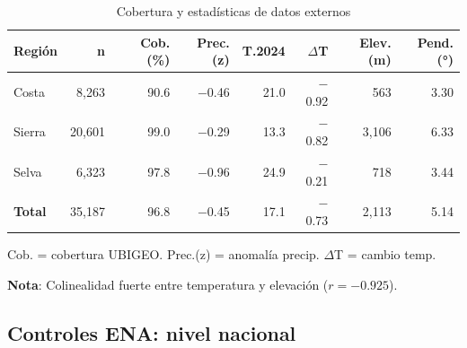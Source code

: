 \documentclass[11pt,a4paper]{article}
\begin{document}
\begin{table}[H]
\centering
\caption{Cobertura y estadísticas de datos externos}
\label{tab:geo_coverage}
\begin{threeparttable}
\small
\begin{tabular}{lrrrrrrr}
\toprule
\textbf{Región} & \textbf{n} & \textbf{Cob. (\%)} & \textbf{Prec.(z)} & \textbf{T.2024} & \textbf{$\Delta$T} & \textbf{Elev.(m)} & \textbf{Pend.(°)} \\
\midrule
Costa & 8,263 & 90.6 & $-$0.46 & 21.0 & $-$0.92 & 563 & 3.30 \\
Sierra & 20,601 & 99.0 & $-$0.29 & 13.3 & $-$0.82 & 3,106 & 6.33 \\
Selva & 6,323 & 97.8 & $-$0.96 & 24.9 & $-$0.21 & 718 & 3.44 \\
\midrule
\textbf{Total} & 35,187 & 96.8 & $-$0.45 & 17.1 & $-$0.73 & 2,113 & 5.14 \\
\bottomrule
\end{tabular}
\begin{tablenotes}
\footnotesize
\item Cob. = cobertura UBIGEO. Prec.(z) = anomalía precip. $\Delta$T = cambio temp.
\end{tablenotes}
\end{threeparttable}
\end{table}

\textbf{Nota}: Colinealidad fuerte entre temperatura y elevación ($r = -0.925$).

\subsection{Controles ENA: nivel nacional}
\end{document}
